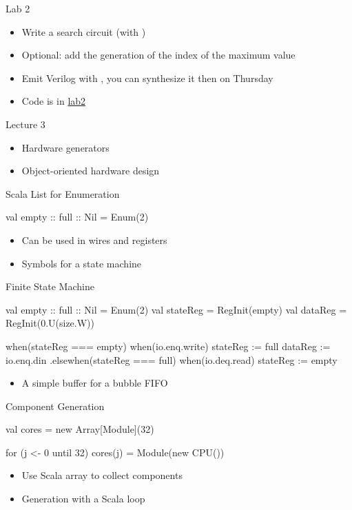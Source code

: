 \begin{frame}[fragile]{Lab 2}
\begin{itemize}
\item Write a search circuit (with )
\item Optional: add the generation of the index of the maximum value
\item Emit Verilog with , you can synthesize it then on Thursday
\item Code is in \href{https://github.com/schoeberl/agile-hw/tree/main/lab2}{lab2}
\end{itemize}
\end{frame}

\begin{frame}[fragile]{Lecture 3}
\begin{itemize}
\item Hardware generators
\item Object-oriented hardware design
\end{itemize}
\end{frame}


\begin{frame}[fragile]{Scala List for Enumeration}
\begin{chisel}
  val empty :: full :: Nil = Enum(2)
\end{chisel}
\begin{itemize}
\item Can be used in wires and registers
\item Symbols for a state machine
\end{itemize}
\end{frame}

\begin{frame}[fragile]{Finite State Machine}
\begin{chisel}
  val empty :: full :: Nil = Enum(2)
  val stateReg = RegInit(empty)
  val dataReg = RegInit(0.U(size.W))

  when(stateReg === empty) {
    when(io.enq.write) {
      stateReg := full
      dataReg := io.enq.din
    }
  }.elsewhen(stateReg === full) {
    when(io.deq.read) {
      stateReg := empty
    }
  }
\end{chisel}
\begin{itemize}
\item A simple buffer for a bubble FIFO
\end{itemize}
\end{frame}

\begin{frame}[fragile]{Component Generation}
\begin{chisel}
val cores = new Array[Module](32)

for (j <- 0 until 32)
  cores(j) = Module(new CPU())
\end{chisel}
\begin{itemize}
\item Use Scala array to collect components
\item Generation with a Scala loop
\end{itemize}
\end{frame}


